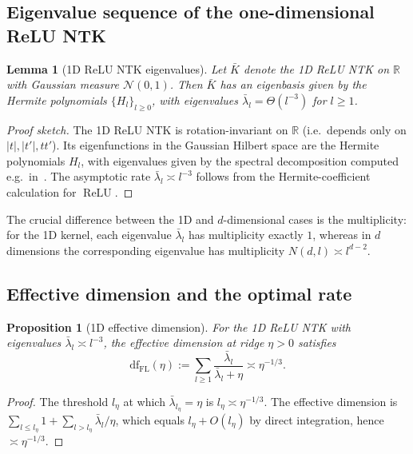 \documentclass[12pt]{amsart}
\newtheorem{lemma}[theorem]{Lemma}
\newtheorem{proposition}[theorem]{Proposition}
\theoremstyle{definition}
\theoremstyle{remark}
\DeclareMathOperator{\relu}{ReLU}
\newcommand{\R}{\mathbb{R}}
\begin{document}
\subsection{Eigenvalue sequence of the one-dimensional ReLU NTK}

\begin{lemma}[1D ReLU NTK eigenvalues]\label{lem:1d-ntk}
Let $\bar K$ denote the 1D ReLU NTK on $\R$ with Gaussian measure
$\mathcal{N}(0,1)$. Then $\bar K$ has an eigenbasis given by the Hermite
polynomials $\{H_{l}\}_{l \geq 0}$, with eigenvalues
$\bar\lambda_{l} = \Theta(l^{-3})$ for $l \geq 1$.
\end{lemma}

\begin{proof}[Proof sketch]
The 1D ReLU NTK is rotation-invariant on $\R$ (i.e.\ depends only on
$|t|, |t'|, tt'$). Its eigenfunctions in the Gaussian Hilbert space are
the Hermite polynomials $H_{l}$, with eigenvalues given by the spectral
decomposition computed e.g.\ in~\cite[Appendix A]{BiettiBruna2021}. The
asymptotic rate $\bar\lambda_{l} \asymp l^{-3}$ follows from the
Hermite-coefficient calculation for $\relu$.
\end{proof}

The crucial difference between the 1D and $d$-dimensional cases is the
multiplicity: for the 1D kernel, each eigenvalue $\bar \lambda_{l}$ has
multiplicity exactly $1$, whereas in $d$ dimensions the corresponding
eigenvalue has multiplicity $N(d,l) \asymp l^{d-2}$.

\subsection{Effective dimension and the optimal rate}

\begin{proposition}[1D effective dimension]\label{prop:1d-df}
For the 1D ReLU NTK with eigenvalues $\bar\lambda_{l} \asymp l^{-3}$,
the effective dimension at ridge $\eta > 0$ satisfies
\[
  \mathrm{df}_{\mathrm{FL}}(\eta) := \sum_{l \geq 1} \frac{\bar\lambda_{l}}{\bar\lambda_{l} + \eta}
  \asymp \eta^{-1/3}.
\]
\end{proposition}

\begin{proof}
The threshold $l_{\eta}$ at which $\bar\lambda_{l_{\eta}} = \eta$ is
$l_{\eta} \asymp \eta^{-1/3}$. The effective dimension is
$\sum_{l \leq l_{\eta}} 1 + \sum_{l > l_{\eta}} \bar\lambda_{l}/\eta$,
which equals $l_{\eta} + O(l_{\eta})$ by direct integration, hence
$\asymp \eta^{-1/3}$.
\end{proof}
\end{document}

